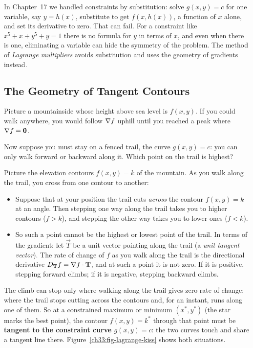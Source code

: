 In Chapter~17 we handled constraints by substitution: solve $g(x,y)=c$ for one
variable, say $y=h(x)$, substitute to get $f(x,h(x))$, a function of $x$ alone, and
set its derivative to zero. That can fail. For a constraint like
$x^5 + x + y^5 + y = 1$ there is no formula for $y$ in terms of $x$, and even when
there is one, eliminating a variable can hide the symmetry of the problem. The
method of \emph{Lagrange multipliers} avoids substitution and uses the geometry of
gradients instead.

\subsection{The Geometry of Tangent Contours}

Picture a mountainside whose height above sea level is $f(x,y)$. If you could walk
anywhere, you would follow $\nabla f$ uphill until you reached a peak where
$\nabla f = \mathbf{0}$.

Now suppose you must stay on a fenced trail, the curve $g(x,y) = c$: you can only
walk forward or backward along it. Which point on the trail is highest?

Picture the elevation contours $f(x,y) = k$ of the mountain. As you walk along the
trail, you cross from one contour to another:
\begin{itemize}
\item Suppose that at your position the trail cuts \emph{across} the contour
$f(x,y) = k$ at an angle. Then stepping one way along the trail takes you to higher
contours ($f > k$), and stepping the other way takes you to lower ones ($f < k$).
\item So such a point cannot be the highest or lowest point of the trail. In terms
of the gradient: let $\vec{T}$ be a unit vector pointing along the trail (a
\emph{unit tangent vector}). The rate of change of $f$ as you walk along the trail
is the directional derivative $D_{\mathbf{T}} f = \nabla f \cdot \mathbf{T}$, and at
such a point it is not zero. If it is positive, stepping forward climbs; if it is negative, stepping backward
climbs.
\end{itemize}

The climb can stop only where walking along the trail gives zero rate of change:
where the trail stops cutting across the contours and, for an instant, runs along
one of them. So at a constrained maximum or minimum $(x^*, y^*)$ (the star marks
the best point), the contour $f(x,y) = k^*$ through that point must be
\textbf{tangent to the constraint curve $g(x,y)=c$}: the two curves touch and share
a tangent line there. Figure~\ref{ch33:fig-lagrange-kiss} shows both situations.

